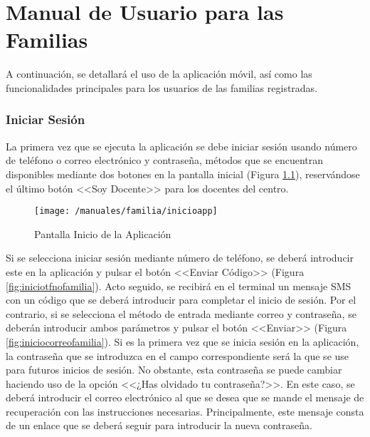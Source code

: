 \chapter{Manual de Usuario para las Familias}
\label{chap:manfamilias}

A continuación, se detallará el uso de la aplicación móvil, así como las funcionalidades principales para los usuarios de las familias registradas.

\subsection*{Iniciar Sesión}
La primera vez que se ejecuta la aplicación se debe iniciar sesión usando número de teléfono o correo electrónico y contraseña, métodos que se encuentran disponibles mediante dos botones en la pantalla inicial (Figura \ref{fig:inicioappfamilia}), reservándose el último botón <<Soy Docente>> para los docentes del centro.

\begin{figure}[!h]
	\begin{center}
		\texttt{[image: /manuales/familia/inicioapp]}
		\caption{Pantalla Inicio de la Aplicación}
		\label{fig:inicioappfamilia}
	\end{center}
\end{figure}

\clearpage

Si se selecciona iniciar sesión mediante número de teléfono, se deberá introducir este en la aplicación y pulsar el botón <<Enviar Código>> (Figura \ref{fig:iniciotfnofamilia}). Acto seguido, se recibirá en el terminal un mensaje \acs{SMS} con un código que se deberá introducir para completar el inicio de sesión. Por el contrario, si se selecciona el método de entrada mediante correo y contraseña, se deberán introducir ambos parámetros y pulsar el botón <<Enviar>> (Figura \ref{fig:iniciocorreofamilia}). Si es la primera vez que se inicia sesión en la aplicación, la contraseña que se introduzca en el campo correspondiente será la que se use para futuros inicios de sesión. No obstante, esta contraseña se puede cambiar haciendo uso de la opción <<¿Has olvidado tu contraseña?>>. En este caso, se deberá introducir el correo electrónico al que se desea que se mande el mensaje de recuperación con las instrucciones necesarias. Principalmente, este mensaje consta de un enlace que se deberá seguir para introducir la nueva contraseña.

